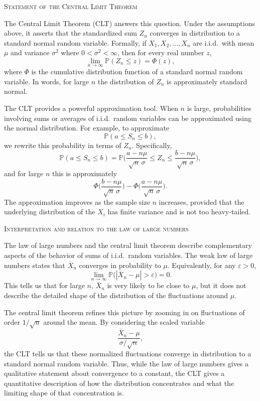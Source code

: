 \bigskip
\textsc{Statement of the Central Limit Theorem}

The Central Limit Theorem (CLT) answers this question.  
Under the assumptions above, it asserts that the standardized sum \(Z_n\) converges in distribution to a standard normal random variable.  
Formally, if \(X_1, X_2, \ldots, X_n\) are i.i.d.\ with mean \(\mu\) and variance \(\sigma^2\) where \(0 < \sigma^2 < \infty\), then for every real number \(z\),
\[
\lim_{n \to \infty} \mathbb{P}(Z_n \leq z)
=
\Phi(z),
\]
where \(\Phi\) is the cumulative distribution function of a standard normal random variable.  
In words, for large \(n\) the distribution of \(Z_n\) is approximately standard normal.

The CLT provides a powerful approximation tool.  
When \(n\) is large, probabilities involving sums or averages of i.i.d.\ random variables can be approximated using the normal distribution.  
For example, to approximate
\[
\mathbb{P}(a \leq S_n \leq b),
\]
we rewrite this probability in terms of \(Z_n\).  
Specifically,
\[
\mathbb{P}(a \leq S_n \leq b)
=
\mathbb{P}\Big(\frac{a - n\mu}{\sqrt{n}\,\sigma} \leq Z_n \leq \frac{b - n\mu}{\sqrt{n}\,\sigma}\Big),
\]
and for large \(n\) this is approximately
\[
\Phi\Big(\frac{b - n\mu}{\sqrt{n}\,\sigma}\Big)
-
\Phi\Big(\frac{a - n\mu}{\sqrt{n}\,\sigma}\Big).
\]
The approximation improves as the sample size \(n\) increases, provided that the underlying distribution of the \(X_i\) has finite variance and is not too heavy-tailed.

\bigskip
\textsc{Interpretation and relation to the law of large numbers}

The law of large numbers and the central limit theorem describe complementary aspects of the behavior of sums of i.i.d.\ random variables.  
The weak law of large numbers states that \(\overline{X}_n\) converges in probability to \(\mu\).  
Equivalently, for any \(\varepsilon > 0\),
\[
\lim_{n \to \infty} \mathbb{P}\big(|\overline{X}_n - \mu| > \varepsilon\big) = 0.
\]
This tells us that for large \(n\), \(\overline{X}_n\) is very likely to be close to \(\mu\), but it does not describe the detailed shape of the distribution of the fluctuations around \(\mu\).

The central limit theorem refines this picture by zooming in on fluctuations of order \(1/\sqrt{n}\) around the mean.  
By considering the scaled variable
\[
\frac{\overline{X}_n - \mu}{\sigma/\sqrt{n}},
\]
the CLT tells us that these normalized fluctuations converge in distribution to a standard normal random variable.  
Thus, while the law of large numbers gives a qualitative statement about convergence to a constant, the CLT gives a quantitative description of how the distribution concentrates and what the limiting shape of that concentration is.

